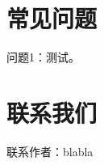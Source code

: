 \documentclass[bachelor,openany,oneside,adobefonts]{buaathesis}
\begin{document}


\maketitle

\tableofcontents

\mainmatter

	

	







\appendix
\chapter{常见问题}
问题1：测试。
\chapter{联系我们}
联系作者：blabla
\end{document}
